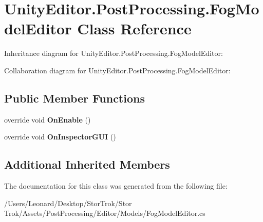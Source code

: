 \hypertarget{class_unity_editor_1_1_post_processing_1_1_fog_model_editor}{}\section{Unity\+Editor.\+Post\+Processing.\+Fog\+Model\+Editor Class Reference}
\label{class_unity_editor_1_1_post_processing_1_1_fog_model_editor}


Inheritance diagram for Unity\+Editor.\+Post\+Processing.\+Fog\+Model\+Editor\+:


Collaboration diagram for Unity\+Editor.\+Post\+Processing.\+Fog\+Model\+Editor\+:
\subsection*{Public Member Functions}
\begin{DoxyCompactItemize}
\item 
\mbox{\label{class_unity_editor_1_1_post_processing_1_1_fog_model_editor_af4c50497dc8b6d6fa9a1f117be43c18b}} 
override void {\bfseries On\+Enable} ()
\item 
\mbox{\label{class_unity_editor_1_1_post_processing_1_1_fog_model_editor_a31db175fb963bd4313e4d49a73d39f47}} 
override void {\bfseries On\+Inspector\+G\+UI} ()
\end{DoxyCompactItemize}
\subsection*{Additional Inherited Members}


The documentation for this class was generated from the following file\+:\begin{DoxyCompactItemize}
\item 
/\+Users/\+Leonard/\+Desktop/\+Stor\+Trok/\+Stor Trok/\+Assets/\+Post\+Processing/\+Editor/\+Models/Fog\+Model\+Editor.\+cs\end{DoxyCompactItemize}
